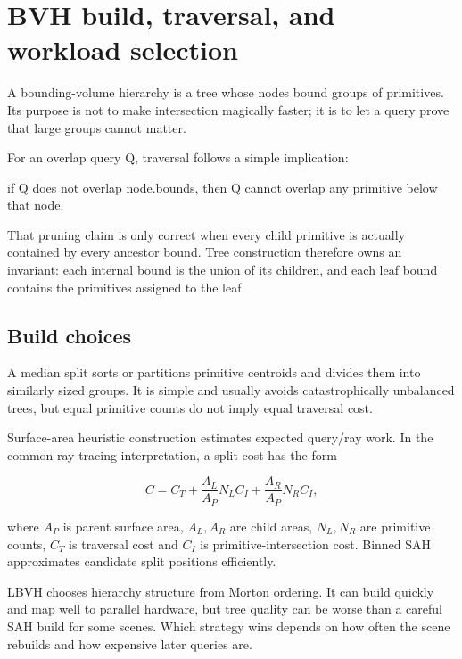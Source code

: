 \hypertarget{appendix-5653a7aea6bb}{}\label{referencestart:appendix-5653a7aea6bb}
\section{BVH build, traversal, and workload selection}\label{appendix-5653a7aea6bb-bvh-build-traversal-and-workload-selection}

A bounding-volume hierarchy is a tree whose nodes bound groups of primitives. Its purpose is not to make intersection magically faster; it is to let a query prove that large groups cannot matter.

For an overlap query Q, traversal follows a simple implication:

if Q does not overlap node.bounds, then Q cannot overlap any primitive below that node.

That pruning claim is only correct when every child primitive is actually contained by every ancestor bound. Tree construction therefore owns an invariant: each internal bound is the union of its children, and each leaf bound contains the primitives assigned to the leaf.

\subsection{Build choices}\label{appendix-5653a7aea6bb-build-choices}

A median split sorts or partitions primitive centroids and divides them into similarly sized groups. It is simple and usually avoids catastrophically unbalanced trees, but equal primitive counts do not imply equal traversal cost.

Surface-area heuristic construction estimates expected query/ray work. In the common ray-tracing interpretation, a split cost has the form

\[
C = C_T +
\frac{A_L}{A_P}N_L C_I +
\frac{A_R}{A_P}N_R C_I,
\]

where \(A_P\) is parent surface area, \(A_L,A_R\) are child areas, \(N_L,N_R\) are primitive counts, \(C_T\) is traversal cost and \(C_I\) is primitive-intersection cost. Binned SAH approximates candidate split positions efficiently.

LBVH chooses hierarchy structure from Morton ordering. It can build quickly and map well to parallel hardware, but tree quality can be worse than a careful SAH build for some scenes. Which strategy wins depends on how often the scene rebuilds and how expensive later queries are.

